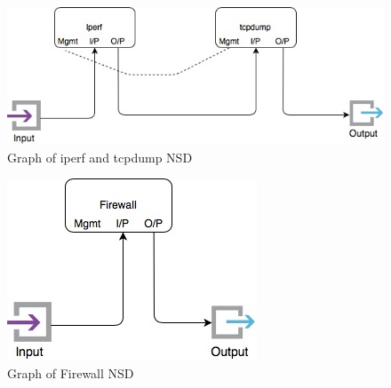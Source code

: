 \begin{frame}
\begin{figure} 
	\centering
	\includegraphics[width=0.6\linewidth]{images/img-4-split}
	\caption{Graph of iperf and tcpdump NSD}
\end{figure}


\begin{figure}
	\centering
	\includegraphics[width=0.3\linewidth]{images/img-5-split}
	\caption{Graph of Firewall NSD}
\end{figure}
\end{frame}


